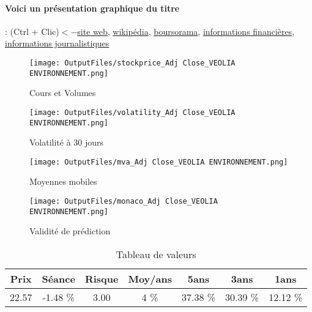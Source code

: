 \documentclass[11pt,a4paper]{report}%
\begin{document}
\paragraph{Voici un présentation graphique du titre} : (Ctrl + Clic)$<-$\href{https://www.veolia.com/fr/investisseurs}{site web}, \href{https://fr.wikipedia.org/wiki/Veolia}{wikipédia}, \href{https://www.boursorama.com/cours/1rPVIE}{boursorama}, \href{https://www.qwant.com/?q=site:https:%2f%2fwww.easybourse.com%2faction-societe%2fVEOLIA-ENVIRONNEMENT&t=web&client=ext-firefox-hp}{informations financières}, \href{https://bourse.lerevenu.com/cours-de-bourse/fiche-valeur-synthese/VEOLIA-ENVIRONNEMENT/VIE-FR}{informations journalistiques}
\begin{figure}[!htb]
   \begin{minipage}{0.5\textwidth}
     \centering
     \texttt{[image: OutputFiles/stockprice\_Adj Close\_VEOLIA ENVIRONNEMENT.png]}
     \caption{Cours et Volumes}\label{Fig:price_VEOLIA ENVIRONNEMENT}
   \end{minipage}\hfill
   \begin{minipage}{0.5\textwidth}
     \centering
     \texttt{[image: OutputFiles/volatility\_Adj Close\_VEOLIA ENVIRONNEMENT.png]}
     \caption{Volatilité à 30 jours}\label{Fig:volat_VEOLIA ENVIRONNEMENT}
   \end{minipage}
\end{figure}
\begin{figure}[!htb]
   \begin{minipage}{0.5\textwidth}
     \centering
     \texttt{[image: OutputFiles/mva\_Adj Close\_VEOLIA ENVIRONNEMENT.png]}
     \caption{Moyennes mobiles}\label{Fig:mva_VEOLIA ENVIRONNEMENT}
   \end{minipage}\hfill
   \begin{minipage}{0.5\textwidth}
     \centering
     \texttt{[image: OutputFiles/monaco\_Adj Close\_VEOLIA ENVIRONNEMENT.png]}
     \caption{Validité de prédiction}\label{Fig:prediction_VEOLIA ENVIRONNEMENT}
   \end{minipage}
\end{figure}

\begin{table}[H]
  \centering
    \begin{tabular}{|c|c|c|c|c|c|c|}
    \hline
    Prix & Séance & Risque  & Moy/ans & 5ans & 3ans & 1ans \\
    \hline
    22.57 &    -1.48 \%    & 3.00 & 4 \% & 37.38 \% & 30.39 \% & 12.12 \% \\
    \hline
    \end{tabular}%
        \label{tab:table_VEOLIA ENVIRONNEMENT}%
      \caption{Tableau de valeurs}
\end{table}%
\end{document}
